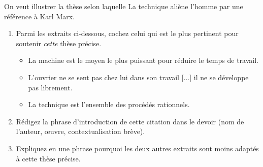 \documentclass[11pt]{article}
\begin{document}
\begin{exercice}
On veut illustrer la thèse selon laquelle \og La technique aliène l'homme \fg{} par une référence à Karl Marx.
\begin{enumerate}
    \item Parmi les extraits ci-dessous, cochez celui qui est le plus pertinent pour soutenir \textit{cette} thèse précise.
    \begin{itemize}
        \item[Extrait 1 :] \og La machine est le moyen le plus puissant pour réduire le temps de travail. \fg
        \item[Extrait 2 :] \og L'ouvrier ne se sent pas chez lui dans son travail [...] il ne se développe pas librement. \fg
        \item[Extrait 3 :] \og La technique est l'ensemble des procédés rationnels. \fg
    \end{itemize}
    \item Rédigez la phrase d'introduction de cette citation dans le devoir (nom de l'auteur, œuvre, contextualisation brève).
    \item Expliquez en une phrase pourquoi les deux autres extraits sont moins adaptés à cette thèse précise.
\end{enumerate}
\end{exercice}
\end{document}
